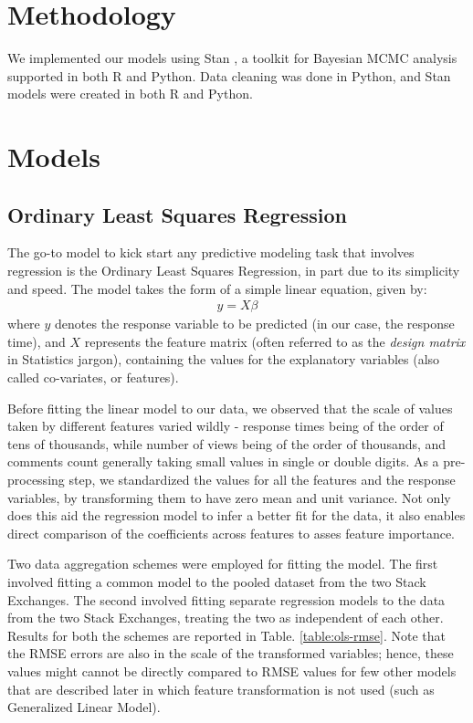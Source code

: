 \documentclass[12pt]{article}
\begin{document}
\section{Methodology}
We implemented our models using Stan \cite{stan}, a toolkit for Bayesian MCMC analysis supported in both R and Python. Data cleaning was done in Python, and Stan models were created in both R and Python. 

\section{Models}
\subsection{Ordinary Least Squares Regression}
The go-to model to kick start any predictive modeling task that involves regression is the Ordinary Least Squares Regression, in part due to its simplicity and speed. The model takes the form of a simple linear equation, given by:
\begin{align*}
y=X\beta
\end{align*}
where $y$ denotes the response variable to be predicted (in our case, the response time), and $X$ represents the feature matrix (often referred to as the \textit{design matrix} in Statistics jargon), containing the values for the explanatory variables (also called co-variates, or features).

Before fitting the linear model to our data, we observed that the scale of values taken by different features varied wildly - response times being of the order of tens of thousands, while number of views being of the order of thousands, and comments count generally taking small values in single or double digits. As a pre-processing step, we standardized the values for all the features and the response variables, by transforming them to have zero mean and unit variance. Not only does this aid the regression model to infer a better fit for the data, it also enables direct comparison of the coefficients across features to asses feature importance.

Two data aggregation schemes were employed for fitting the model. The first involved fitting a common model to the pooled dataset from the two Stack Exchanges. The second involved fitting separate regression models to the data from the two Stack Exchanges, treating the two as independent of each other. Results for both the schemes are reported in Table. \ref{table:ols-rmse}. Note that the RMSE errors are also in the scale of the transformed variables; hence, these values might cannot be directly compared to RMSE values for few other models that are described later in which feature transformation is not used (such as Generalized Linear Model). 
\end{document}
